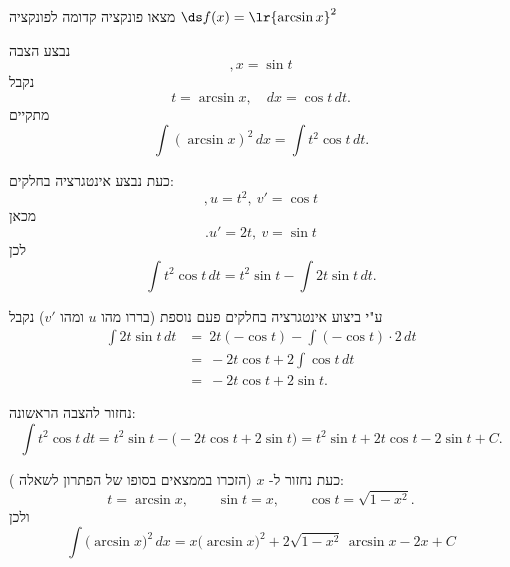 מצאו פונקציה קדומה לפונקציה
$\ds f(x)=\lr{\arcsin x}^{2}$
\begin{solbox}
נבצע הצבה
$$,x=\sin t$$
נקבל
$$t=\arcsin x,\quad dx=\cos t\,dt.$$
מתקיים
\[
\int (\arcsin x)^2\,dx=\int t^2\cos t\,dt.
\]

כעת נבצע אינטגרציה בחלקים:
\[
,u=t^2,\ v'=\cos t
\]
מכאן
$$.u'=2t,\ v=\sin t
$$
לכן
\[
\int t^2\cos t\,dt
=t^2\sin t-\int 2t\sin t\,dt.
\]

ע"י ביצוע אינטגרציה בחלקים פעם נוספת
(בררו מהו
$u$
ומהו
$v'$)
נקבל
\begin{align*}
\int 2t\sin t\,dt&
=\ 2t(-\cos t)-\int (-\cos t)\cdot 2\,dt\\
&=\ -2t\cos t+2\int \cos t\,dt\\
&=\ -2t\cos t+2\sin t.
\end{align*}

נחזור להצבה הראשונה:
\[
\int t^2\cos t\,dt
=t^2\sin t-\bigl(-2t\cos t+2\sin t\bigr)
=t^2\sin t+2t\cos t-2\sin t+C.
\]

כעת נחזור ל- \(x\)
(הזכרו בממצאים בסופו של הפתרון לשאלה
):
\[
t=\arcsin x,\qquad \sin t=x,\qquad \cos t=\sqrt{1-x^2}.
\]
ולכן
\[
\boxed{
\int \bigl(\arcsin x\bigr)^2\,dx
= x\bigl(\arcsin x\bigr)^2
+2\sqrt{1-x^2}\,\arcsin x
-2x+C
}
\]
\end{solbox}
